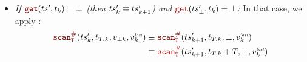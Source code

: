 \begin{skippableproof}
\begin{itemize}
\begin{itemize}
                        The coinduction hypothesis states:
                        \begin{equation*}
                            \from{\ts}{t_{k+1}} \equiv \scanAux{\ts'_{k+1}}{T}{t_{T, k+1}}{v_{\bot k+1}}{v^\explast_{k+1}}.
                        \end{equation*}

                        Knowing that $\getAt{\ts}{t_k} = v_u$ and $t_k = t_{T, k}$ ensures:
                        \begin{align*}
                            \from{\ts}{t_k} & \equiv (t_k, v_u) \next \from{\ts}{t_{k+1}}                                                 \\
                                            & \equiv (t_k, v_u) \next \scanAux{\ts'_{k+1}}{T}{t_{T, k+1}}{v_{\bot k+1}}{v^\explast_{k+1}} \\
                                            & \equiv \scanAux{\ts'_k}{T}{t_{T, k}}{v_{\bot k}}{v^\explast_k},
                        \end{align*}
                        which conclude this case.

                  \item \textit{If $\getAt{\ts'}{t_k} = \bot$ (then $ts'_k \equiv ts'_{k+1}$) and
                        $\getAt{\ts'_\bot}{t_k} = \bot$:} In that case, we apply
                        :
                        \begin{align*}
                            \scanAux{\ts'_k}{T}{t_{T, k}}{v_{\bot k}}{v^\explast_k} & \equiv
                            \scanAux{\ts'_{k+1}}{T}{t_{T, k}}{\bot}{v^\explast_k}            \\
                                                                                    & \equiv
                            \scanAux{\ts'_{k+1}}{T}{t_{T, k} + T}{\bot}{v^\explast_k}
                        \end{align*}


\end{itemize}
\end{itemize}
\end{skippableproof}
